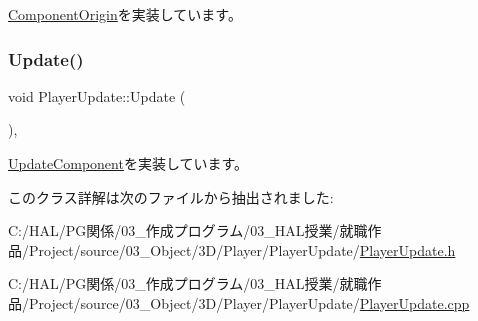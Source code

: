 \mbox{\hyperlink{class_component_origin_a9f89a93f9c1954bd53f9750e35e6089d}{Component\+Origin}}を実装しています。

\mbox{\label{class_player_update_af6e1b8ca60399f232e64d2acb4968c75}} 
\subsubsection{\texorpdfstring{Update()}{Update()}}
{\footnotesize\ttfamily void Player\+Update\+::\+Update (\begin{DoxyParamCaption}{ }\end{DoxyParamCaption})\hspace{0.3cm}{\ttfamily [override]}, {\ttfamily [virtual]}}



\mbox{\hyperlink{class_update_component_ade313ad8bf19a81e7d098aa830d9f01b}{Update\+Component}}を実装しています。



このクラス詳解は次のファイルから抽出されました\+:\begin{DoxyCompactItemize}
\item 
C\+:/\+H\+A\+L/\+P\+G関係/03\+\_\+作成プログラム/03\+\_\+\+H\+A\+L授業/就職作品/\+Project/source/03\+\_\+\+Object/3\+D/\+Player/\+Player\+Update/\mbox{\hyperlink{_player_update_8h}{Player\+Update.\+h}}\item 
C\+:/\+H\+A\+L/\+P\+G関係/03\+\_\+作成プログラム/03\+\_\+\+H\+A\+L授業/就職作品/\+Project/source/03\+\_\+\+Object/3\+D/\+Player/\+Player\+Update/\mbox{\hyperlink{_player_update_8cpp}{Player\+Update.\+cpp}}\end{DoxyCompactItemize}
